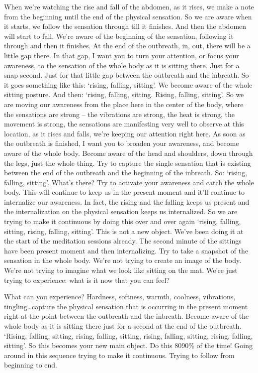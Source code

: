 \documentclass[letterpaper,10pt,english]{sphinxmanual}
\begin{document}
\sphinxAtStartPar
When we’re watching the rise and fall of the abdomen, as it rises, we
make a note from the beginning until the end of the physical sensation. So
we are aware when it starts, we follow the sensation through till it finishes.
And then the abdomen will start to fall. We’re aware of the beginning of the
sensation,  following  it  through  and  then  it  finishes. At  the  end  of  the  outbreath, in, out, there will be a little gap there. In that gap, I want you to turn
your attention, or focus your awareness, to the sensation of the whole body
  as it is sitting there. Just for a snap second. Just for that little gap between the
out\sphinxhyphen{}breath and the in\sphinxhyphen{}breath. So it goes something like this: ‘rising, falling,
sitting’. We become aware of the whole sitting posture. And then: ‘rising,
falling,  sitting.  Rising,  falling,  sitting’.  So  we  are  moving  our  awareness
from the place here in the center of the body, where the sensations are strong
– the vibrations are strong, the heat is strong, the movement is strong, the
sensations are manifesting very well to observe at this location, as it rises
and falls, we’re keeping our attention right here. As soon as the out\sphinxhyphen{}breath
is finished, I want you to broaden your awareness, and become aware of the
whole  body.  Become  aware  of  the  head  and  shoulders,  down  through  the
legs, just the whole thing. Try to capture the single sensation that is existing
between  the  end  of  the  out\sphinxhyphen{}breath  and  the  beginning  of  the  in\sphinxhyphen{}breath.  So:
‘rising,  falling,  sitting’.  What’s  there?  Try  to  activate  your  awareness  and
catch the whole body. This will continue to keep us in the present moment
and  it’ll  continue  to  internalize  our  awareness.  In  fact,  the  rising  and  the
falling  keeps  us  present  and  the  internalization  on  the  physical  sensation
keeps us internalized. So we are trying to make it continuous by doing this
over and over again ‘rising, falling, sitting, rising, falling, sitting’. This is
not a new object. We’ve been doing it at the start of the meditation sessions
already. The  second  minute  of  the  sittings  have  been  present  moment  and
then internalizing. Try to take a snapshot of the sensation in the whole body.
We’re not trying to create an image of the body. We’re not trying to imagine
what we look like sitting on the mat. We’re just trying to experience: what is
it now that you can feel?

\sphinxAtStartPar
What  can  you  experience?  Hardness,  softness,  warmth,  coolness,
vibrations, tingling…capture the physical sensation that is occurring in the
present moment right at the point between the out\sphinxhyphen{}breath and the in\sphinxhyphen{}breath.
Become aware of the whole body as it is sitting there just for a second at the
end of the out\sphinxhyphen{}breath. ‘Rising, falling, sitting, rising, falling, sitting, rising,
falling,  sitting,  rising,  falling,  sitting’.  So  this  becomes  your  new  main
object. Do this 80\sphinxhyphen{}90\% of the time! Going around in this sequence trying to
make it continuous. Trying to follow from beginning to end.
\end{document}
